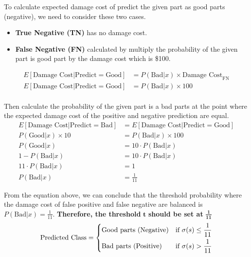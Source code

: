 \documentclass[12pt, a4paper]{article}
\begin{document}
            To calculate expected damage cost of predict the given part as good parts (negative), we need to consider these two cases.
            \begin{itemize}
                \item \textbf{True Negative (TN)} has no damage cost.
                \item \textbf{False Negative (FN)} calculated by multiply the probability of the given part is good part by the damage cost which is \$100.
            \end{itemize}
            \begin{align*}
                E[\text{Damage Cost} | \text{Predict} = \text{Good}] &= P(\text{Bad} | x) \times {\text{Damage Cost}}_{\text{FN}} \\
                E[\text{Damage Cost} | \text{Predict} = \text{Good}] &= P(\text{Bad} | x) \times 100 \\
            \end{align*}

    \pagebreak

            Then calculate the probability of the given part is a bad parts at the point where the expected damage cost of the positive and negative prediction are equal.
            \begin{align*}
                E[\text{Damage Cost} | \text{Predict} = \text{Bad}] &= E[\text{Damage Cost} | \text{Predict} = \text{Good}] \\
                P(\text{Good} | x) \times 10 &= P(\text{Bad} | x) \times 100 \\
                P(\text{Good} | x) &= 10 \cdot P(\text{Bad} | x) \\
                1 - P(\text{Bad} | x) &= 10 \cdot P(\text{Bad} | x) \\
                11 \cdot P(\text{Bad} | x) &= 1 \\
                P(\text{Bad} | x) &= \frac{1}{11}
            \end{align*}

            From the equation above, we can conclude that the threshold probability where the damage cost of
            false positive and false negative are balanced is $P(\text{Bad} | x) = \frac{1}{11}$.
            \textbf{Therefore, the threshold} $\mathbf{t}$ \textbf{should be set at} $\mathbf{\frac{1}{11}}$
            \begin{align*}
                \text{Predicted Class} =
                \begin{dcases}
                    \text{Good parts (Negative)} & \text{if } \sigma(s) \leq \frac{1}{11} \\
                    \text{Bad parts (Positive)} & \text{if } \sigma(s) > \frac{1}{11}
                \end{dcases}
            \end{align*}
\end{document}
